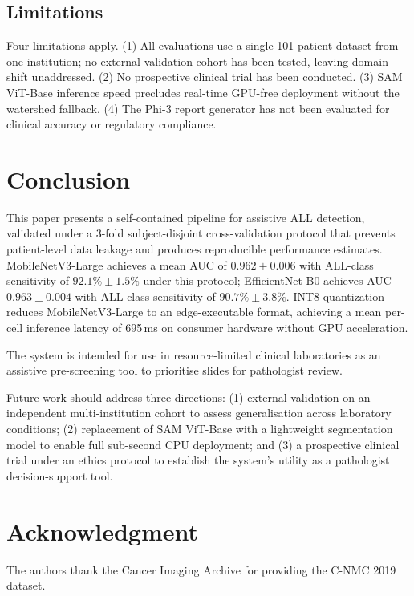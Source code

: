 \documentclass[journal,twoside,web]{ieeecolor}
\begin{document}
\subsection{Limitations}
Four limitations apply. (1) All evaluations use a single 101-patient dataset from one institution; no external validation cohort has been tested, leaving domain shift \cite{b6} unaddressed. (2) No prospective clinical trial has been conducted. (3) SAM ViT-Base inference speed precludes real-time GPU-free deployment without the watershed fallback. (4) The Phi-3 report generator has not been evaluated for clinical accuracy or regulatory compliance.

\section{Conclusion}
\label{sec:conclusion}
This paper presents a self-contained pipeline for assistive ALL detection, validated under a 3-fold subject-disjoint cross-validation protocol that prevents patient-level data leakage and produces reproducible performance estimates. MobileNetV3-Large achieves a mean AUC of $0.962 \pm 0.006$ with ALL-class sensitivity of $92.1\% \pm 1.5\%$ under this protocol; EfficientNet-B0 achieves AUC $0.963 \pm 0.004$ with ALL-class sensitivity of $90.7\% \pm 3.8\%$. INT8 quantization reduces MobileNetV3-Large to an edge-executable format, achieving a mean per-cell inference latency of 695\,ms on consumer hardware without GPU acceleration.

The system is intended for use in resource-limited clinical laboratories as an assistive pre-screening tool to prioritise slides for pathologist review.

Future work should address three directions: (1) external validation on an independent multi-institution cohort to assess generalisation across laboratory conditions; (2) replacement of SAM ViT-Base with a lightweight segmentation model to enable full sub-second CPU deployment; and (3) a prospective clinical trial under an ethics protocol to establish the system's utility as a pathologist decision-support tool.

\appendices

\section*{Acknowledgment}
The authors thank the Cancer Imaging Archive for providing the C-NMC 2019 dataset.
\end{document}
